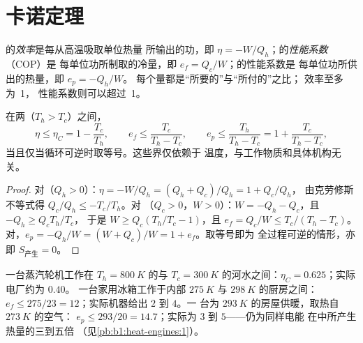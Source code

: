 \section{卡诺定理}

\begin{definition}[效率与性能系数]\label{def:b1:heat-engines:efficiency}
的\emph{效率}是每从高温吸取单位热量
所输出的功，即 $\eta = -W/Q_h$；的\emph{性能系数}（COP）是
每单位功所制取的冷量，即 $e_f = Q_c/W$；的性能系数是
每单位功所供出的热量，即 $e_p = -Q_h/W$。
每个量都是“所要的”与“所付的”之比；
效率至多为~1，
性能系数则可以超过~1。
\end{definition}

\begin{theorem}[卡诺]\label{thm:b1:heat-engines:carnot}
在两（$T_h > T_c$）之间，
\[
\eta \leq \eta_C = 1 - \frac{T_c}{T_h}, \qquad
e_f \leq \frac{T_c}{T_h - T_c}, \qquad
e_p \leq \frac{T_h}{T_h - T_c} = 1 + \frac{T_c}{T_h - T_c},
\]
当且仅当循环可逆时取等号。这些界仅依赖于
温度，与工作物质和具体机构无关。
\end{theorem}

\begin{proof}
对（$Q_h > 0$）：$\eta = -W/Q_h = (Q_h + Q_c)/Q_h = 1 + Q_c/Q_h$，
由克劳修斯不等式得 $Q_c/Q_h \leq -T_c/T_h$。对
（$Q_c > 0$，$W > 0$）：$W = -Q_h - Q_c$，且 $-Q_h \geq Q_c T_h/T_c$，
于是 $W \geq Q_c(T_h/T_c - 1)$，且 $e_f = Q_c/W \leq T_c/(T_h - T_c)$。
对，$e_p = -Q_h/W = (W + Q_c)/W = 1 + e_f$。取等号即为
全过程可逆的情形，亦即 $S_{\text{产生}} = 0$。
\end{proof}

\begin{example}[三个数]\label{ex:b1:heat-engines:numbers}
一台蒸汽轮机工作在 $T_h = \qty{800}{K}$ 的与
$T_c = \qty{300}{K}$ 的河水之间：$\eta_C = 0.625$；实际电厂约为 $0.40$。
一台家用冰箱工作于内部 $\qty{275}{K}$ 与
$\qty{298}{K}$ 的厨房之间：$e_f \leq 275/23 = 12$；实际机器给出 $2$ 到 $4$。一
台为 $\qty{293}{K}$ 的房屋供暖，取热自 $\qty{273}{K}$ 的空气：
$e_p \leq 293/20 = 14.7$；实际为 $3$ 到 $5$——仍为同样电能
在中所产生热量的三到五倍
（见\cref{pb:b1:heat-engines:1}）。
\end{example}

